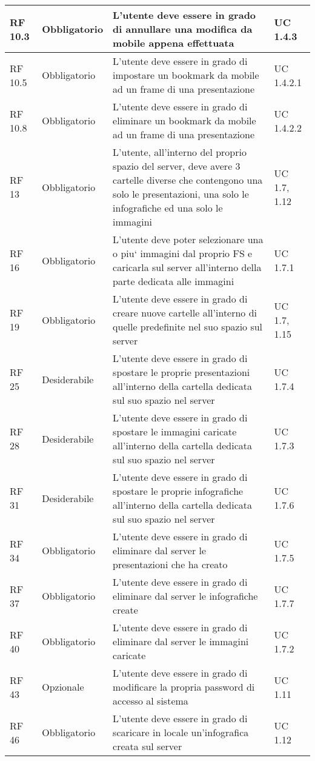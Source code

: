 {\begin{longtable} [c]{| p{2.5cm} | p{2.5cm} | p{6cm} |p{2.5cm}|}
			\hline
			RF 10.3 & Obbligatorio & L'utente deve essere in grado di annullare una modifica da mobile appena effettuata & UC 1.4.3\\
			\hline
			RF 10.5 & Obbligatorio & L'utente deve essere in grado di impostare un bookmark da mobile ad un frame di una presentazione & UC 1.4.2.1\\
			\hline
			RF 10.8 & Obbligatorio & L'utente deve essere in grado di eliminare un bookmark da mobile ad un frame di una presentazione & UC 1.4.2.2\\
			\hline
			RF 13 & Obbligatorio & L’utente, all’interno del proprio spazio del server, deve avere 3 cartelle diverse che contengono una solo le presentazioni, una solo le infografiche ed una solo le immagini & UC 1.7, 1.12\\
			\hline
			RF 16 & Obbligatorio & L’utente deve poter selezionare una o piu` immagini dal proprio FS e caricarla sul server all’interno della parte dedicata alle immagini & UC 1.7.1\\
			\hline
			RF 19 & Obbligatorio & L’utente deve essere in grado di creare nuove cartelle all’interno di quelle predefinite nel suo spazio sul server & UC 1.7, 1.15\\
			\hline
			RF 25 & Desiderabile & L'utente deve essere in grado di spostare le proprie presentazioni all’interno della cartella dedicata sul suo spazio nel server & UC 1.7.4\\
			\hline
			RF 28 & Desiderabile & L'utente deve essere in grado di spostare le immagini caricate all’interno della cartella dedicata sul suo spazio nel server & UC 1.7.3\\
			\hline
			RF 31 & Desiderabile & L'utente deve essere in grado di spostare le proprie infografiche all’interno della cartella dedicata sul suo spazio nel server & UC 1.7.6\\
			\hline
			RF 34 & Obbligatorio & L’utente deve essere in grado di eliminare dal server le presentazioni che ha creato  & UC 1.7.5\\
			\hline
			RF 37 & Obbligatorio & L’utente deve essere in grado di eliminare dal server le infografiche create & UC 1.7.7\\
			\hline
			RF 40 & Obbligatorio & L’utente deve essere in grado di eliminare dal server le immagini caricate & UC 1.7.2\\
			\hline
			RF 43 & Opzionale & L'utente deve essere in grado di modificare la propria password di accesso al sistema & UC 1.11\\
			\hline
			RF 46 & Obbligatorio & L'utente deve essere in grado di scaricare in locale un’infografica creata sul server & UC 1.12\\

\end{longtable}}
